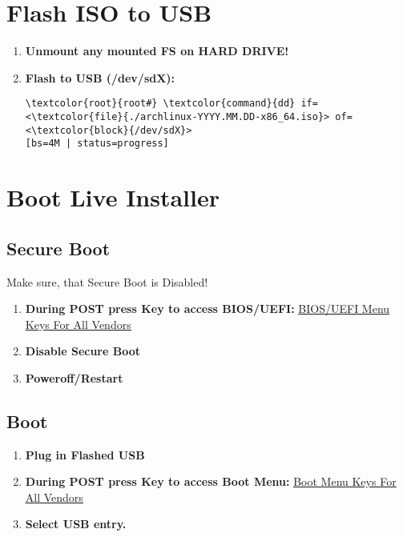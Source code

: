 \documentclass[10pt, a4paper, onecolumn, openany]{book} %
\begin{document}
\section{Flash ISO to USB}
\begin{enumerate}
    \item \textbf{Unmount any mounted FS on HARD DRIVE!}
    \item \textbf{Flash to USB (/dev/sdX):}
\begin{Verbatim}[commandchars=\\\{\}]
\textcolor{root}{root#} \textcolor{command}{dd} if=<\textcolor{file}{./archlinux-YYYY.MM.DD-x86_64.iso}> of=<\textcolor{block}{/dev/sdX}> 
[bs=4M | status=progress]
\end{Verbatim}
\end{enumerate}
\section{Boot Live Installer}
\subsection{Secure Boot}
Make sure, that Secure Boot is Disabled!
\begin{enumerate}
    \item \textbf{During POST press Key to access BIOS/UEFI:}
\newline \underline{\href{https://techofide.com/blogs/boot-menu-option-keys-for-all-computers-and-laptops-updated-list-2021-techofide/}{BIOS/UEFI Menu Keys For All Vendors}}
    \item \textbf{Disable Secure Boot}
    \item \textbf{Poweroff/Restart}
\end{enumerate}
\subsection{Boot}
\begin{enumerate}
    \item \textbf{Plug in Flashed USB}
    \item \textbf{During POST press Key to access Boot Menu:}
\newline \underline{\href{https://techofide.com/blogs/boot-menu-option-keys-for-all-computers-and-laptops-updated-list-2021-techofide/}{Boot Menu Keys For All Vendors}}
    \item \textbf{Select USB entry.}
\end{enumerate}
\end{document}
